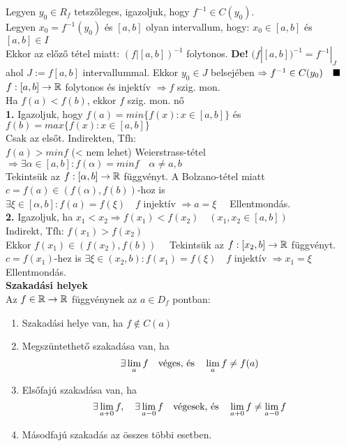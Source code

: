 \documentclass[a4paper,11pt]{article}
\begin{document}
\biz Legyen $y_0\in R_f$ tetszőleges, igazoljuk, hogy $f^{-1}\in C(y_0)$.
\\[0.1cm]Legyen $x_0=f^{-1}(y_0)$ és $[a,b]$ olyan intervallum, hogy: $x_0\in[a,b]$
és $[a,b]\in I$\\[0.1cm]Ekkor az előző tétel miatt: $(f|[a,b])^{-1}$ folytonos.
\textbf{De!} $(f|[a,b])^{-1}=f^{-1}|_J$\\[0.1cm]ahol $J:=f[a,b]$ intervallummal.
Ekkor $y_0\in J$ belsejében $\Rightarrow f^{-1}\in C(y_0)\quad\blacksquare$\\[0.2cm]
\tetel $f:[a,b]\to\mathbb{R}$ folytonos és injektív $\Rightarrow f$ szig. mon.\\[0.1cm]
\biz Ha $f(a)<f(b)$, ekkor $f$ szig. mon. nő\\[0.1cm] \textbf{1.} Igazoljuk, hogy
$f(a)=min\{f(x):x\in[a,b]\}$ és $f(b)=max\{f(x):x\in[a,b]\}$\\[0.1cm] Csak az
elsőt. Indirekten, Tfh:\\[0.1cm] $f(a)>min f$ (< nem lehet) Weierstrass-tétel
$\Rightarrow\exists\alpha\in[a,b]:f(\alpha)=min f\quad\alpha\neq a,b$\\[0.1cm]
Tekintsük az $f:[\alpha,b]\to\mathbb{R}$ függvényt. A Bolzano-tétel miatt $c=f(a)
\in(f(\alpha),f(b))$-hoz is\\[0.1cm] $\exists\xi\in[\alpha,b]:f(a)=f(\xi)\quad f$
injektív $\Rightarrow a=\xi\quad$ Ellentmondás.\\[0.1cm]\textbf{2.} Igazoljuk, ha
$x_1<x_2\Rightarrow f(x_1)<f(x_2)\quad(x_1,x_2\in[a,b])$\\[0.1cm]Indirekt, Tfh:
$f(x_1)>f(x_2)$\\[0.1cm]Ekkor $f(x_1)\in(f(x_2),f(b))\quad$ Tekintsük az $f:[x_2,b]
\to\mathbb{R}$ függvényt.\\[0.1cm]$c=f(x_1)$-hez is $\exists\xi\in(x_2,b):
f(x_1)=f(\xi)\quad f$ injektív $\Rightarrow x_1=\xi\quad$ Ellentmondás.\\[0.2cm]
\textbf{{\Large Szakadási helyek}}\\[0.2cm]
 Az $f\in\mathbb{R}\to\mathbb{R}$ függvénynek az $a\in D_f$ pontban:
\begin{enumerate}
	\item Szakadási helye van, ha $f\notin C(a)$
	\item Megszüntethető szakadása van, ha \[ \exists\lim_{a} f\text{\quad véges, és\quad } \lim_a f\not=f(a)\]
	\item Elsőfajú szakadása van, ha
	\[ \exists \lim_{a+0} f,\quad \exists\lim_{a-0}f \text{\quad végesek, és\quad } \lim_{a+0} f \not= \lim_{a-0}f \]
	\item Másodfajú szakadás az összes többi esetben.
\end{enumerate}
\end{document}
